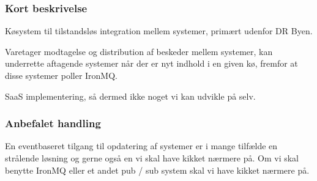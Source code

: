 \documentclass{article}
\begin{document}
\subsubsection{Kort beskrivelse}
Køsystem til tilstandsløs integration mellem systemer, primært udenfor DR Byen.

Varetager modtagelse og distribution af beskeder mellem systemer, kan underrette aftagende systemer når der er nyt indhold i en given kø, fremfor at disse systemer poller IronMQ.

SaaS implementering, så dermed ikke noget vi kan udvikle på selv.
\subsubsection{Anbefalet handling}
En eventbaseret tilgang til opdatering af systemer er i mange tilfælde en strålende løsning og gerne også en vi skal have kikket nærmere på. Om vi skal benytte IronMQ eller et andet pub / sub system skal vi have kikket nærmere på.
\end{document}
